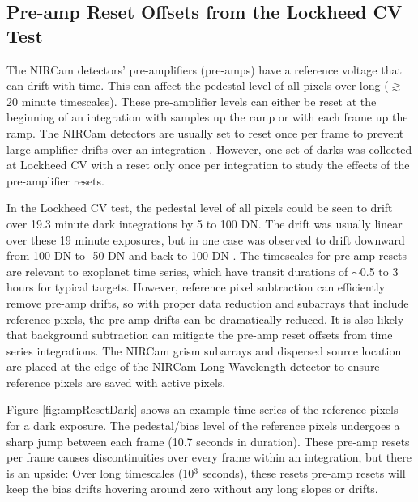 \documentclass{aastex62}
\begin{document}
\subsection{Pre-amp Reset Offsets from the Lockheed CV Test}\label{sec:preAmp}

The NIRCam detectors' pre-amplifiers (pre-amps) have a reference voltage that can drift with time.
This can affect the pedestal level of all pixels over long ($\gtrsim$ 20 minute timescales).
These pre-amplifier levels can either be reset at the beginning of an integration with samples up the ramp or with each frame up the ramp.
The NIRCam detectors are usually set to reset once per frame to prevent large amplifier drifts over an integration \citep{robberto2014refPixPreAmp}.
However, one set of darks was collected at Lockheed CV with a reset only once per integration to study the effects of the pre-amplifier resets.

In the Lockheed CV test, the pedestal level of all pixels could be seen to drift over 19.3 minute dark integrations by 5 to 100 DN.
The drift was usually linear over these 19 minute exposures, but in one case was observed to drift downward from 100 DN to -50 DN and back to 100 DN \citep{robberto2014refPixPreAmp}.
The timescales for pre-amp resets are relevant to exoplanet time series, which have transit durations of $\sim$0.5 to 3 hours for typical targets.
However, reference pixel subtraction can efficiently remove pre-amp drifts, so with proper data reduction and subarrays that include reference pixels, the pre-amp drifts can be dramatically reduced.
It is also likely that background subtraction can mitigate the pre-amp reset offsets from time series integrations.
The NIRCam grism subarrays and dispersed source location are placed at the edge of the NIRCam Long Wavelength detector to ensure reference pixels are saved with active pixels.

Figure \ref{fig:ampResetDark} shows an example time series of the reference pixels for a dark exposure.
The pedestal/bias level of the reference pixels undergoes a sharp jump between each frame (10.7 seconds in duration).
These pre-amp resets per frame causes discontinuities over every frame within an integration, but there is an upside:
Over long timescales (10$^3$ seconds), these resets pre-amp resets will keep the bias drifts hovering around zero without any long slopes or drifts.
\end{document}
